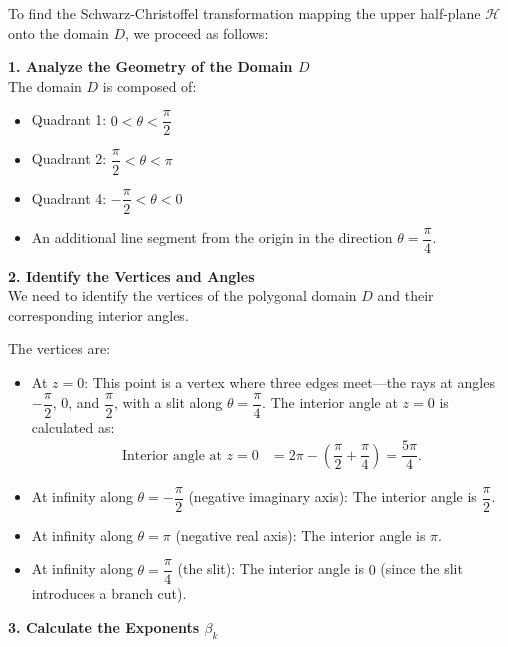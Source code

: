 \begin{example}
    To find the Schwarz-Christoffel transformation mapping the upper half-plane $\mathcal{H}$ onto the domain $D$, we proceed as follows:

    \textbf{1. Analyze the Geometry of the Domain $D$} \\

    The domain $D$ is composed of:

    \begin{itemize}
        \item Quadrant 1: $0 < \theta < \dfrac{\pi}{2}$
        \item Quadrant 2: $\dfrac{\pi}{2} < \theta < \pi$
        \item Quadrant 4: $-\dfrac{\pi}{2} < \theta < 0$
        \item An additional line segment from the origin in the direction $\theta = \dfrac{\pi}{4}$.
    \end{itemize}

    \textbf{2. Identify the Vertices and Angles} \\

    We need to identify the vertices of the polygonal domain $D$ and their corresponding interior angles.

    The vertices are:

    \begin{itemize}
        \item At $z = 0$: This point is a vertex where three edges meet—the rays at angles $-\dfrac{\pi}{2}$, $0$, and $\dfrac{\pi}{2}$, with a slit along $\theta = \dfrac{\pi}{4}$. The interior angle at $z = 0$ is calculated as:
              \begin{align*}
                  \text{Interior angle at } z = 0 & = 2\pi - \left( \dfrac{\pi}{2} + \dfrac{\pi}{4} \right) = \dfrac{5\pi}{4}.
              \end{align*}
        \item At infinity along $\theta = -\dfrac{\pi}{2}$ (negative imaginary axis): The interior angle is $\dfrac{\pi}{2}$.
        \item At infinity along $\theta = \pi$ (negative real axis): The interior angle is $\pi$.
        \item At infinity along $\theta = \dfrac{\pi}{4}$ (the slit): The interior angle is $0$ (since the slit introduces a branch cut).
    \end{itemize}

    \textbf{3. Calculate the Exponents $\beta_k$} \\


\end{example}
